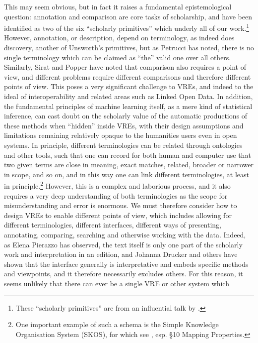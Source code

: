 This may seem obvious, but in fact it raises a fundamental epistemological
question: annotation and comparison are core tasks of scholarship, and have
been identified as two of the six “scholarly primitives” which underly all of
our work.\footnote{These “scholarly primitives” are from an influential talk by \cite{unsworth2000scholarly}.} However, annotation, or description, depend on terminology, as
indeed does discovery, another of Unsworth’s primitives, but as Petrucci has
noted, there is no single terminology which can be claimed as “the” valid one
over all others. Similarly, Sirat and Popper have noted that comparison also
requires a point of view, and different problems require different comparisons
and therefore different points of view. This poses a very significant challenge
to VREs, and indeed to the ideal of interoperability and related areas such as
Linked Open Data. In addition, the fundamental principles of machine learning
itself, as a mere kind of statistical inference, can cast doubt on the
scholarly value of the automatic productions of these methods when “hidden”
inside VREs, with their design assumptions and limitations remaining relatively
opaque to the humanities users even in open systems. In principle, different
terminologies can be related through ontologies and other tools, such that one
can record for both human and computer use that two given terms are close in
meaning, exact matches, related, broader or narrower in scope, and so on, and
in this way one can link different terminologies, at least in
principle.\footnote{One important example of such a schema is the Simple
Knowledge Organisation System (SKOS), for which see \cite{miles2009skos},
esp. §10 Mapping Properties.}
However, this is a complex and laborious process, and it also requires a very
deep understanding of both terminologies as the scope for misunderstanding and
error is enormous. We must therefore consider how to design VREs to enable
different points of view, which includes allowing for different terminologies,
different interfaces, different ways of presenting, annotating, comparing,
searching and otherwise working with the data. Indeed, as Elena Pierazzo has
observed, the text itself is only one part of the scholarly work and
interpretation in an edition, and Johanna Drucker and others have shown that
the interface generally is interpretative and embeds specific methods and
viewpoints, and it therefore necessarily excludes
others\cite{pierazzo2011rationale,drucker2014graphesis}.  For this reason, it
seems unlikely that there can ever be a single VRE or other system which
